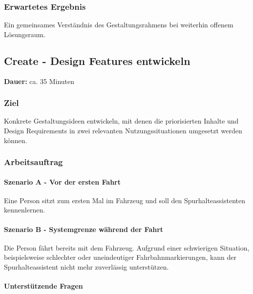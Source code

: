 \subsubsection*{Erwartetes Ergebnis}

Ein gemeinsames Verständnis des Gestaltungsrahmens bei weiterhin offenem Lösungsraum.


\clearpage

\subsection{Create - Design Features entwickeln}
\label{subsec:workshop-create}

\noindent
\textbf{Dauer:} ca. 35 Minuten

\subsubsection*{Ziel}

Konkrete Gestaltungsideen entwickeln, mit denen die priorisierten
Inhalte und Design Requirements in zwei relevanten Nutzungssituationen
umgesetzt werden können.

\subsubsection*{Arbeitsauftrag}

\paragraph*{Szenario A - Vor der ersten Fahrt}

Eine Person sitzt zum ersten Mal im Fahrzeug und soll den
Spurhalteassistenten kennenlernen.

\paragraph*{Szenario B - Systemgrenze während der Fahrt}

Die Person fährt bereits mit dem Fahrzeug. Aufgrund einer schwierigen
Situation, beispielsweise schlechter oder uneindeutiger Fahrbahnmarkierungen, kann der Spurhalteassistent nicht mehr zuverlässig unterstützen.

\paragraph*{Unterstützende Fragen}

